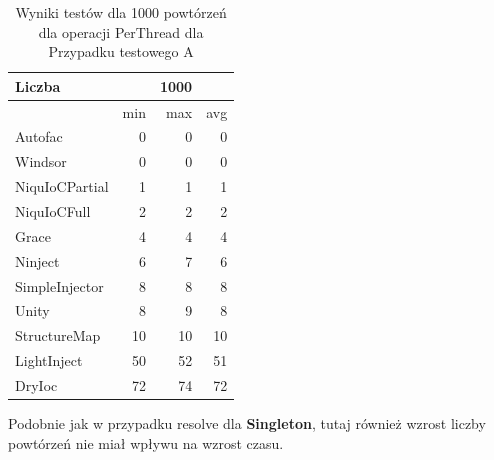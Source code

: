 \documentclass[12pt]{article}
\begin{document}
\begin{table}[H]
\captionsetup{belowskip=0pt,aboveskip=0pt}
\begin{center}
\begin{small}
	\begin{tabular}{ | l | r r r | }
    		\hline
Liczba & & 1000 & \\ \hline
 & min & max & avg \\ \hline
Autofac & 0 & 0 & 0 \\ \hline
Windsor & 0 & 0 & 0 \\ \hline
NiquIoCPartial & 1 & 1 & 1 \\ \hline
NiquIoCFull & 2 & 2 & 2 \\ \hline
Grace & 4 & 4 & 4 \\ \hline
Ninject & 6 & 7 & 6 \\ \hline
SimpleInjector & 8 & 8 & 8 \\ \hline
Unity & 8 & 9 & 8 \\ \hline
StructureMap & 10 & 10 & 10 \\ \hline
LightInject & 50 & 52 & 51 \\ \hline
DryIoc & 72 & 74 & 72 \\ \hline
  	\end{tabular}
\end{small}
\end{center}
\caption{Wyniki testów dla 1000 powtórzeń dla operacji PerThread dla Przypadku testowego A}
\label{TestCaseA_PerThread1000}
\end{table}
Podobnie jak w przypadku resolve dla \textbf{Singleton}, tutaj również wzrost liczby powtórzeń nie miał wpływu na wzrost czasu.
\end{document}
